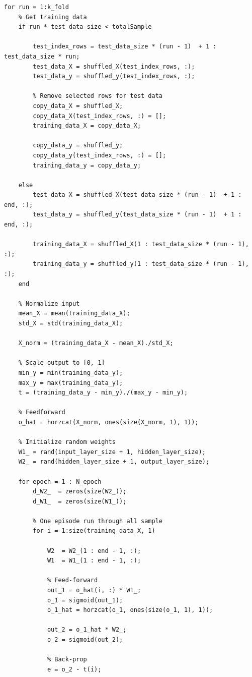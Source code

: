 \documentclass[12pt]{article}
\begin{document}
\begin{itemize}
\begin{lstlisting}
for run = 1:k_fold
    % Get training data
    if run * test_data_size < totalSample
        
        test_index_rows = test_data_size * (run - 1)  + 1 : test_data_size * run;
        test_data_X = shuffled_X(test_index_rows, :);
        test_data_y = shuffled_y(test_index_rows, :);
        
        % Remove selected rows for test data
        copy_data_X = shuffled_X;
        copy_data_X(test_index_rows, :) = [];
        training_data_X = copy_data_X;
        
        copy_data_y = shuffled_y;
        copy_data_y(test_index_rows, :) = [];
        training_data_y = copy_data_y;
        
    else
        test_data_X = shuffled_X(test_data_size * (run - 1)  + 1 : end, :);
        test_data_y = shuffled_y(test_data_size * (run - 1)  + 1 : end, :);
        
        training_data_X = shuffled_X(1 : test_data_size * (run - 1), :);
        training_data_y = shuffled_y(1 : test_data_size * (run - 1), :);
    end

    % Normalize input
    mean_X = mean(training_data_X);
    std_X = std(training_data_X);
       
    X_norm = (training_data_X - mean_X)./std_X;

    % Scale output to [0, 1]
    min_y = min(training_data_y);
    max_y = max(training_data_y);
    t = (training_data_y - min_y)./(max_y - min_y);

    % Feedforward
    o_hat = horzcat(X_norm, ones(size(X_norm, 1), 1));

    % Initialize random weights
    W1_ = rand(input_layer_size + 1, hidden_layer_size);
    W2_ = rand(hidden_layer_size + 1, output_layer_size);

    for epoch = 1 : N_epoch
        d_W2_  = zeros(size(W2_));
        d_W1_  = zeros(size(W1_));    

        % One episode run through all sample
        for i = 1:size(training_data_X, 1)

            W2  = W2_(1 : end - 1, :);
            W1  = W1_(1 : end - 1, :);

            % Feed-forward
            out_1 = o_hat(i, :) * W1_;
            o_1 = sigmoid(out_1);
            o_1_hat = horzcat(o_1, ones(size(o_1, 1), 1));

            out_2 = o_1_hat * W2_;
            o_2 = sigmoid(out_2);

            % Back-prop
            e = o_2 - t(i);


\end{lstlisting}
\end{itemize}
\end{document}
